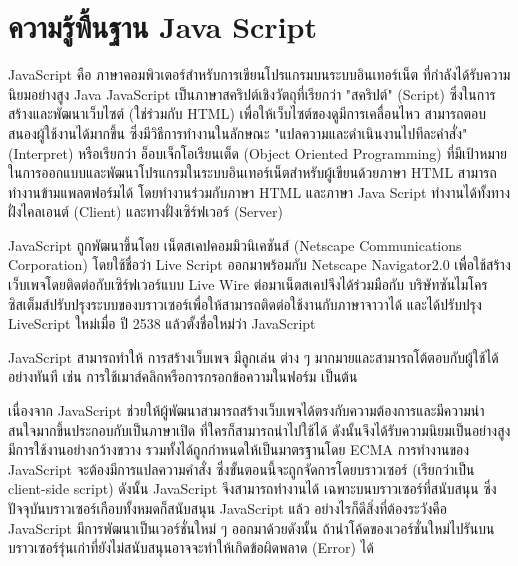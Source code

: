 	\section{ความรู้พื้นฐาน Java Script}
	 JavaScript \cite{js} คือ ภาษาคอมพิวเตอร์สำหรับการเขียนโปรแกรมบนระบบอินเทอร์เน็ต ที่กำลังได้รับความนิยมอย่างสูง Java JavaScript เป็นภาษาสคริปต์เชิงวัตถุที่เรียกว่า "สคริปต์"  (Script) ซึ่งในการสร้างและพัฒนาเว็บไซต์ (ใช่ร่วมกับ HTML) เพื่อให้เว็บไซต์ของดูมีการเคลื่อนไหว สามารถตอบสนองผู้ใช้งานได้มากขึ้น ซึ่งมีวิธีการทำงานในลักษณะ "แปลความและดำเนินงานไปทีละคำสั่ง" (Interpret) หรือเรียกว่า อ็อบเจ็กโอเรียนเต็ด (Object Oriented Programming) ที่มีเป้าหมายในการออกแบบและพัฒนาโปรแกรมในระบบอินเทอร์เน็ตสำหรับผู้เขียนด้วยภาษา HTML สามารถทำงานข้ามแพลตฟอร์มได้ โดยทำงานร่วมกับภาษา HTML และภาษา Java Script ทำงานได้ทั้งทางฝั่งไคลเอนต์ (Client) และทางฝั่งเซิร์ฟเวอร์ (Server) 
	 
	 JavaScript ถูกพัฒนาขึ้นโดย เน็ตสเคปคอมมิวนิเคชันส์ (Netscape Communications Corporation) โดยใช้ชื่อว่า Live Script ออกมาพร้อมกับ Netscape Navigator2.0 เพื่อใช้สร้างเว็บเพจโดยติดต่อกับเซิร์ฟเวอร์แบบ Live Wire ต่อมาเน็ตสเคปจึงได้ร่วมมือกับ บริษัทซันไมโครซิสเต็มส์ปรับปรุงระบบของบราวเซอร์เพื่อให้สามารถติดต่อใช้งานกับภาษาจาวาได้ และได้ปรับปรุง LiveScript ใหม่เมื่อ ปี 2538 แล้วตั้งชื่อใหม่ว่า JavaScript 
	 
	 JavaScript สามารถทำให้ การสร้างเว็บเพจ มีลูกเล่น ต่าง ๆ มากมายและสามารถโต้ตอบกับผู้ใช้ได้อย่างทันที เช่น การใช้เมาส์คลิกหรือการกรอกข้อความในฟอร์ม เป็นต้น 
	 
	 เนื่องจาก JavaScript ช่วยให้ผู้พัฒนาสามารถสร้างเว็บเพจได้ตรงกับความต้องการและมีความน่าสนใจมากขึ้นประกอบกับเป็นภาษาเปิด ที่ใครก็สามารถนำไปใช้ได้ ดังนั้นจึงได้รับความนิยมเป็นอย่างสูง มีการใช้งานอย่างกว้างขวาง รวมทั้งได้ถูกกำหนดให้เป็นมาตรฐานโดย ECMA การทำงานของ JavaScript จะต้องมีการแปลความคำสั่ง ซึ่งขั้นตอนนี้จะถูกจัดการโดยบราวเซอร์ (เรียกว่าเป็น client-side script) ดังนั้น JavaScript จึงสามารถทำงานได้ เฉพาะบนบราวเซอร์ที่สนับสนุน ซึ่งปัจจุบันบราวเซอร์เกือบทั้งหมดก็สนับสนุน JavaScript แล้ว อย่างไรก็ดีสิ่งที่ต้องระวังคือ JavaScript มีการพัฒนาเป็นเวอร์ชั่นใหม่ ๆ ออกมาด้วยดังนั้น ถ้านำโค้ดของเวอร์ชั่นใหม่ไปรันบนบราวเซอร์รุ่นเก่าที่ยังไม่สนับสนุนอาจจะทำให้เกิดข้อผิดพลาด (Error) ได้
	 
